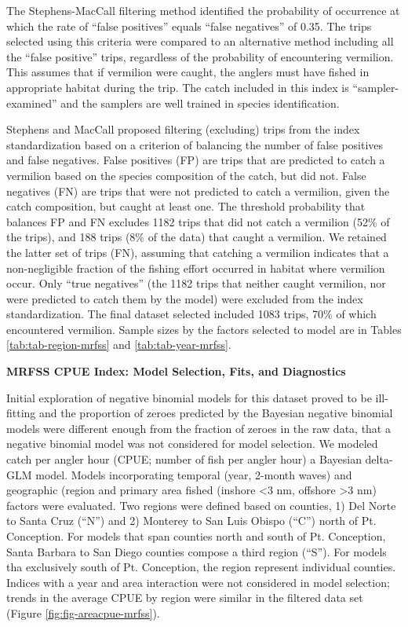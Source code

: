 \documentclass[
  english,
  a4paper,
]{article}
\begin{document}
The Stephens-MacCall filtering method identified the probability of occurrence
at which the rate of ``false
positives'' equals ``false negatives'' of 0.35. The
trips selected using this criteria were compared to an alternative method
including all the ``false positive'' trips, regardless of the probability of
encountering vermilion.
This assumes that if vermilion were caught, the anglers must have fished in
appropriate habitat during the trip. The catch included in this index is
``sampler-examined'' and the samplers are well trained in species identification.

Stephens and MacCall proposed filtering (excluding) trips from the index
standardization based on a criterion of balancing the number of false positives
and false negatives. False positives (FP) are trips that are predicted to catch
a vermilion based on the species composition of the catch, but did not. False
negatives (FN) are trips that were not predicted to catch a vermilion, given the
catch composition, but caught at least one. The threshold probability that
balances FP and FN excludes
1182
trips that did not catch a vermilion (52\%
of the trips), and 188
trips (8\% of the data) that
caught a vermilion. We retained the latter set of trips (FN), assuming that
catching a vermilion indicates that a non-negligible fraction of the fishing
effort occurred in habitat where vermilion occur. Only ``true negatives''
(the 1182
trips that neither caught vermilion, nor were predicted to catch them by the model)
were excluded from the index standardization. The final dataset selected included
1083 trips, 70\%
of which encountered vermilion. Sample sizes by the factors selected to model are in Tables
\ref{tab:tab-region-mrfss} and \ref{tab:tab-year-mrfss}.

\textbf{MRFSS CPUE Index: Model Selection, Fits, and Diagnostics}

Initial exploration of negative binomial models for this dataset proved to be
ill-fitting and the proportion of zeroes predicted by the Bayesian negative binomial
models were different enough from the fraction of zeroes in the raw data, that
a negative binomial model was not considered for model selection. We modeled catch
per angler hour (CPUE; number of fish per angler hour) a Bayesian delta-GLM model.
Models incorporating temporal (year, 2-month waves)
and geographic (region and primary area fished (inshore \textless3 nm, offshore \textgreater3 nm)
factors were evaluated. Two regions were defined based on counties, 1) Del Norte
to Santa Cruz (``N'') and 2) Monterey to San Luis Obispo (``C'') north of Pt. Conception.
For models that span counties north and south of Pt. Conception, Santa Barbara to
San Diego counties compose a third region (``S''). For models tha exclusively south
of Pt. Conception, the region represent individual counties. Indices with a year
and area interaction were not considered in model selection; trends in the average
CPUE by region were similar in the filtered data set (Figure \ref{fig:fig-areacpue-mrfss}).
\end{document}
